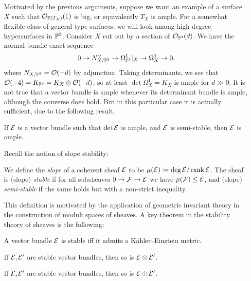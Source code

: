 Motivated by the previous arguments, suppose we want an example of a surface $X$
such that $\O_{\P(T_X)}(1)$ is big, or equivalently $T_X$ is ample. For a
somewhat flexible class of general type surfaces, we will look among high degree
hypersurfaces in $\P^3$. Consider $X$ cut out by a section of $\O_{\P^3}(d)$. We
have the normal bundle exact sequence
\begin{equation*}
    0 \to N_{X/\P^3}^\vee \to \Omega^1_{\P^3}|_X \to \Omega^1_X \to 0,
\end{equation*}
where $N_{X/\P^3}=\O(-d)$ by adjunction. Taking determinants, we see that
$\O(-4)=K_{\P^3}=K_X\otimes\O(-d)$, so at least $\det\Omega^1_X=K_X$ is ample
for $d\gg0$. It is not true that a vector bundle is ample whenever its
determinant bundle is ample, although the converse does hold. %
But in this particular case it is actually sufficient, due to the following
result.

\begin{proposition}
    If $\calE$ is a vector bundle such that $\det\calE$ is ample, and $\calE$ is
    semi-stable, then $\calE$ is ample.
\end{proposition}



Recall the notion of slope stability:

\begin{definition}
    We define the \emph{slope} of a coherent sheaf $\calE$ to be
    $\mu(\calE)\coloneqq\deg\calE/\rank\calE$. The sheaf is (slope)
    \emph{stable} if for all subsheaves $0\to\calF\to\calE$ we have
    $\mu(\calF)\le\calE$, and (slope) \emph{semi-stable} if the same holds but
    with a non-strict inequality. %
\end{definition}

This definition is motivated by the application of geometric invariant theory in
the construction of moduli spaces of sheaves. A key theorem in the stability
theory of sheaves is the following:

\begin{theorem}[Yau]
    A vector bundle $\calE$ is stable iff it admits a K\"ahler--Einstein metric.
\end{theorem}

\begin{proposition}
    If $\calE,\calE'$ are stable vector bundles, then so is $\calE\otimes\calE'$.
\end{proposition}

\begin{proposition}
    If $\calE,\calE'$ are stable vector bundles, then so is $\calE\oplus\calE'$.
\end{proposition}


